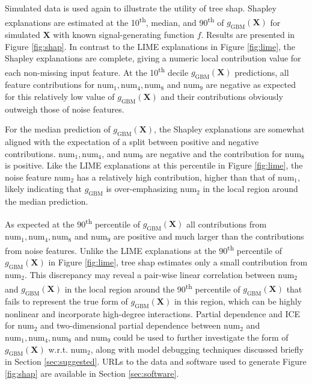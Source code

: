 \documentclass[11pt]{asaproc}
\begin{document}
Simulated data is used again to illustrate the utility of tree shap. Shapley explanations are estimated at the 10\textsuperscript{th}, median, and 90\textsuperscript{th} of $g_{\text{GBM}}(\mathbf{X})$ for simulated $\mathbf{X}$ with known signal-generating function $f$. Results are presented in Figure \ref{fig:shap}. In contrast to the LIME explanations in Figure \ref{fig:lime}, the Shapley explanations are complete, giving a numeric local contribution value for each non-missing input feature. At the 10\textsuperscript{th} decile $g_{\text{GBM}}(\mathbf{X})$ predictions, all feature contributions for $\text{num}_1, \text{num}_4, \text{num}_8$ and $\text{num}_9$ are negative as expected for this relatively low value of $g_{\text{GBM}}(\mathbf{X})$ and their contributions obviously outweigh those of noise features.

For the median prediction of $g_{\text{GBM}}(\mathbf{X})$, the Shapley explanations are somewhat aligned with the expectation of a split between positive and negative contributions. $\text{num}_1, \text{num}_4$, and $\text{num}_9$ are negative and the contribution for $\text{num}_8$ is positive. Like the LIME explanations at this percentile in Figure \ref{fig:lime}, the noise feature $\text{num}_2$ has a relatively high contribution, higher than that of $\text{num}_1$, likely indicating that $g_{\text{GBM}}$ is over-emphasizing $\text{num}_2$ in the local region around the median prediction. 

As expected at the 90\textsuperscript{th} percentile of $g_{\text{GBM}}(\mathbf{X})$ all contributions from $\text{num}_1, \text{num}_4, \text{num}_8$ and $\text{num}_9$ are positive and much larger than the contributions from noise features. Unlike the LIME explanations at the 90\textsuperscript{th} percentile of $g_{\text{GBM}}(\mathbf{X})$ in Figure \ref{fig:lime}, tree shap estimates only a small contribution from $\text{num}_2$. This discrepancy may reveal a pair-wise linear correlation between $\text{num}_2$ and $g_{\text{GBM}}(\mathbf{X})$ in the local region around the 90\textsuperscript{th} percentile of $g_{\text{GBM}}(\mathbf{X})$ that fails to represent the true form of $g_{\text{GBM}}(\mathbf{X})$ in this region, which can be highly nonlinear and incorporate high-degree interactions. Partial dependence and ICE for $\text{num}_2$ and two-dimensional partial dependence between $\text{num}_2$ and $\text{num}_1, \text{num}_4, \text{num}_8$ and $\text{num}_9$ could be used to further investigate the form of $g_{\text{GBM}}(\mathbf{X})$ w.r.t. $\text{num}_2$, along with model debugging techniques discussed briefly in Section \ref{sec:suggested}. URLs to the data and software used to generate Figure \ref{fig:shap} are available in Section \ref{sec:software}.
\end{document}
